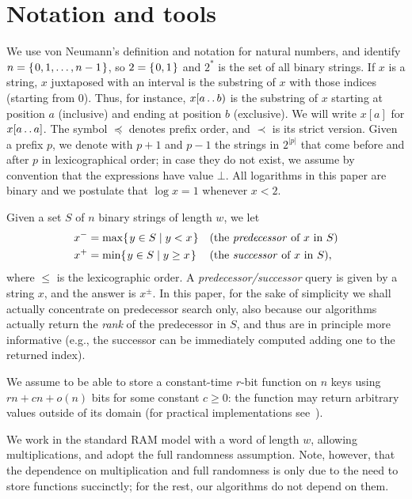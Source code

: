 \documentclass[a4paper,11pt]{article}
\newcommand{\?}{\mskip1.5mu}
\def\..{\,\mathpunct{\ldotp\ldotp}} %
\begin{document}
\section{Notation and tools}
\label{sec:notation}

We use von Neumann's definition
and notation for natural numbers, and identify $n=\{\?0, 1, \ldots, n-1\?\}$, so
$2=\{\?0,1\?\}$ and $2^*$ is the set of all binary strings.
If $x$ is a string, $x$ juxtaposed with an interval is the substring of $x$ with
those indices (starting from 0). Thus, for instance, $x[a\..b)$
is the substring of $x$ starting at position $a$ (inclusive) and ending at position
$b$ (exclusive). We will write $x[a]$ for $x[a\..a]$. The symbol $\preceq$
denotes prefix order, and $\prec$ is its strict version. Given a prefix $p$, we
denote with $p+1$ and $p-1$ the strings in $2^{|p|}$ that come before and after
$p$ in lexicographical order; in case they do not exist, we assume by convention
that the expressions have value $\bot$. 
All logarithms in this paper are binary and we postulate that $\log x=1$
whenever $x<2$.

Given a set $S$ of $n$ binary strings of length $w$, we let
\begin{align*}
	x^- &= \max\{\?y \in S \mid y< x\?\} &&\text{(the \emph{predecessor} of
	$x$ in $S$)}\\
	x^+ &= \min\{\?y \in S \mid y\geq x\?\} && \text{(the \emph{successor} of
	$x$ in $S$)},
\end{align*}
where $\leq$ is the lexicographic order. A \emph{predecessor/successor} query is
given by a string $x$, and the answer is $x^\pm$. In this paper, for the sake
of simplicity we shall actually concentrate on predecessor search only,
also because our algorithms actually return the \emph{rank} of the predecessor
in $S$, and thus are in principle more informative (e.g., the successor can be
immediately computed adding one to the returned index).

We assume to be able to store a constant-time $r$-bit function on $n$ keys using
$rn+cn +o(n)$ bits for some constant $c\geq 0$: the function may return
arbitrary values outside of its domain (for practical implementations
see~\cite{BelazzouguiBoPaVi11}).

We work in the standard RAM model with a word of length $w$, allowing
multiplications, and adopt the full randomness assumption. Note, however, 
that the dependence on multiplication and full randomness is only due to the
need to store functions succinctly; for the rest, our algorithms do not depend
on them.
\end{document}
